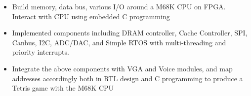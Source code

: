 \documentclass[10pt,a4paper,ragged2e,withhyper]{altacv}
\begin{document}
\begin{paracol}{2}
\divider

\begin{itemize}
\item Build {memory, data bus, various I/O} around a M68K CPU on FPGA. Interact with CPU using embedded C programming
\item Implemented components including {DRAM controller, Cache Controller, SPI, Canbus, I2C, ADC/DAC}, and {Simple RTOS} with multi-threading and priority interrupts.
\item Integrate the above components with VGA and Voice modules, and map addresses accordingly both in RTL design and C programming to produce a Tetris game with the M68K CPU
\end{itemize}



\medskip







\end{paracol}
\end{document}
